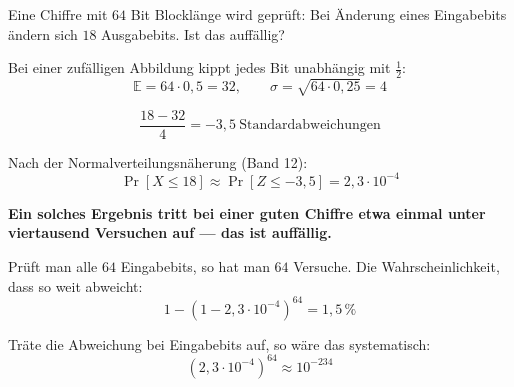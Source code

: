 \begin{aufgabe}
Eine Chiffre mit $64$ Bit Blocklänge wird geprüft: Bei Änderung eines Eingabebits ändern sich $18$ Ausgabebits. Ist das auffällig?

\loesung
{}
Bei einer zufälligen Abbildung kippt jedes Bit unabhängig mit $\frac12$:
\[ \mathbb{E} = 64\cdot0{,}5 = 32, \qquad \sigma = \sqrt{64\cdot0{,}25} = 4 \]

\[ \frac{18-32}{4} = -3{,}5 \ \text{Standardabweichungen} \]

Nach der Normalverteilungsnäherung (Band 12):
\[ \Pr[X \le 18] \approx \Pr[Z \le -3{,}5] = 2{,}3\cdot10^{-4} \]

\begin{center}
\begin{minipage}{0.9\textwidth}
\textbf{Ein solches Ergebnis tritt bei einer guten Chiffre etwa einmal unter viertausend Versuchen auf --- das ist auffällig.}
\end{minipage}
\end{center}

Prüft man alle $64$ Eingabebits, so hat man $64$ Versuche. Die Wahrscheinlichkeit, dass  so weit abweicht:
\[ 1-(1-2{,}3\cdot10^{-4})^{64} = 1{,}5\,\% \]

\begin{center}
\begin{minipage}{0.88\textwidth}
\end{minipage}
\end{center}

Träte die Abweichung bei  Eingabebits auf, so wäre das systematisch:
\[ (2{,}3\cdot10^{-4})^{64} \approx 10^{-234} \]

\begin{center}
\begin{minipage}{0.88\textwidth}
\end{minipage}
\end{center}
\end{aufgabe}

